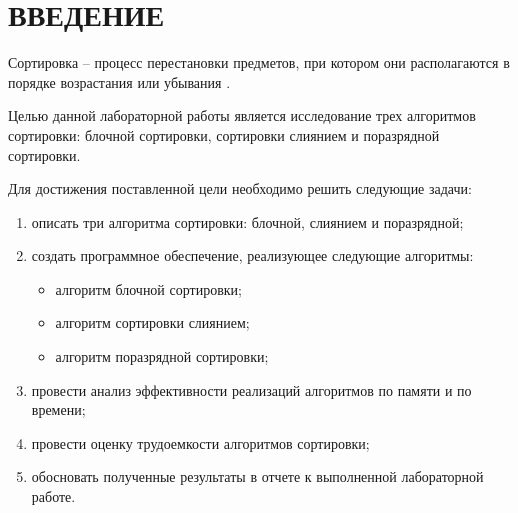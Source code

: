 \chapter*{ВВЕДЕНИЕ}

Сортировка -- процесс перестановки предметов, при котором они располагаются в порядке возрастания или убывания \cite{whatIsSort}.

Целью данной лабораторной работы является исследование трех алгоритмов сортировки: блочной сортировки, сортировки слиянием и поразрядной сортировки.

Для достижения поставленной цели необходимо решить следующие задачи:

\begin{enumerate}[label={\arabic*)}]
	\item описать три алгоритма сортировки: блочной, слиянием и поразрядной;
	\item создать программное обеспечение, реализующее следующие алгоритмы:
	\begin{itemize}[label=--]
		\item алгоритм блочной сортировки;
		\item алгоритм сортировки слиянием;
		\item алгоритм поразрядной сортировки;
	\end{itemize}
	\item провести анализ эффективности реализаций алгоритмов по памяти и по времени;
	\item провести оценку трудоемкости алгоритмов сортировки;
	\item обосновать полученные результаты в отчете к выполненной лабораторной работе.
\end{enumerate}
